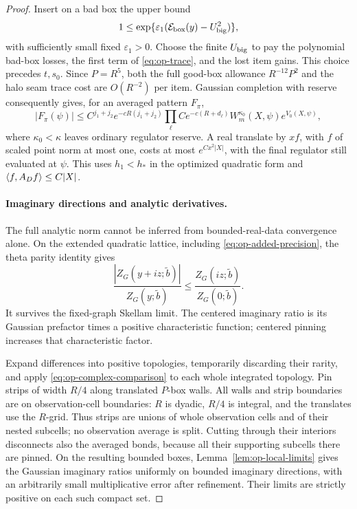 \begin{proof}
Insert on a bad box the upper bound
\[
 1\leq\exp\{\varepsilon_1(
                    {\cal E}_{\rm box}(y)-U_{\rm big}^2)\},
\]
with sufficiently small fixed \(\varepsilon_1>0\).
Choose the finite \(U_{\rm big}\) to pay the polynomial
bad-box losses, the first term of \eqref{eq:op-trace},
and the lost item gains.  This choice precedes \(t,s_0\).
Since \(P=R^5\), both the full good-box allowance
\(R^{-12}P^2\) and the halo seam trace cost are
\(O(R^{-2})\) per item.  Gaussian completion with reserve consequently
gives, for an averaged pattern \(F_\pi\),
\begin{equation}\label{eq:op-real-pattern}
 |F_\pi(\psi)|
 \leq C^{j_1+j_2}e^{-cR(j_1+j_2)}
       \prod_\ell Ce^{-c(R+d_\ell)}
                     W_m^{\kappa_0}(X,\psi)e^{V_0(X,\psi)},
\end{equation}
where \(\kappa_0<\kappa\) leaves ordinary regulator
reserve.  A real translate by \(xf\), with \(f\) of
scaled point norm at most one, costs at most
\(e^{Cx^2|X|}\), with the final regulator still evaluated
at \(\psi\).  This uses \(h_1<h_*\) in the optimized
quadratic form and
\(\langle f,A_Df\rangle\leq C|X|\).

\paragraph{Imaginary directions and analytic derivatives.}
The full analytic norm cannot be inferred from
bounded-real-data convergence alone.  On the extended
quadratic lattice, including
\eqref{eq:op-added-precision}, the theta parity identity
 gives
\begin{equation}\label{eq:op-complex-comparison}
 \frac{|Z_G(y+iz;\widetilde b)|}{Z_G(y;\widetilde b)}
             \leq\frac{Z_G(iz;\widetilde b)}{Z_G(0;\widetilde b)}.
\end{equation}
It survives the fixed-graph Skellam limit.  The centered
imaginary ratio is its Gaussian prefactor times a
positive characteristic function; centered pinning
increases that characteristic factor.

Expand differences into positive topologies, temporarily
discarding their rarity, and apply
\eqref{eq:op-complex-comparison} to each whole integrated
topology.  Pin strips of width \(R/4\) along translated
\(P\)-box walls.  All walls and strip boundaries are
on observation-cell boundaries: \(R\) is dyadic,
\(R/4\) is integral, and the translates use the
\(R\)-grid.  Thus strips are unions of whole
observation cells and of their nested subcells;
no observation average is split.  Cutting through their interiors
disconnects also the averaged bonds, because all their
supporting subcells there are pinned.  On the resulting
bounded boxes, Lemma~\ref{lem:op-local-limits} gives the
Gaussian imaginary ratios uniformly on bounded
imaginary directions, with an arbitrarily small
multiplicative error after refinement.  Their limits
are strictly positive on each such compact set.


\end{proof}
